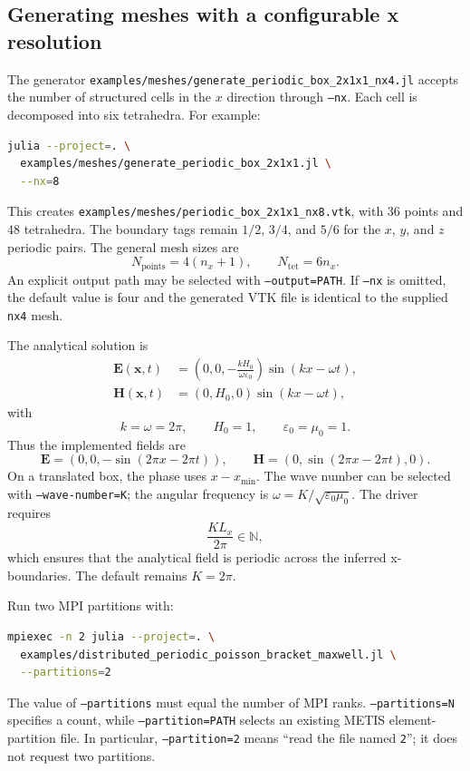 \documentclass[11pt,oneside]{book}
\newcommand{\code}[1]{\texttt{#1}}
\newcommand{\vect}[1]{\boldsymbol{#1}}
\begin{document}
\subsection{Generating meshes with a configurable x resolution}

The generator
\code{examples/meshes/generate\_periodic\_box\_2x1x1\_nx4.jl} accepts the
number of structured cells in the $x$ direction through \code{--nx}. Each
cell is decomposed into six tetrahedra. For example:
\begin{lstlisting}[language=bash]
julia --project=. \
  examples/meshes/generate_periodic_box_2x1x1.jl \
  --nx=8
\end{lstlisting}
This creates
\code{examples/meshes/periodic\_box\_2x1x1\_nx8.vtk}, with 36 points and
48 tetrahedra. The boundary tags remain $1/2$, $3/4$, and $5/6$ for the
$x$, $y$, and $z$ periodic pairs. The general mesh sizes are
\[
  N_{\mathrm{points}}=4(n_x+1),\qquad
  N_{\mathrm{tet}}=6n_x.
\]
An explicit output path may be selected with \code{--output=PATH}. If
\code{--nx} is omitted, the default value is four and the generated VTK file
is identical to the supplied \code{nx4} mesh.

The analytical solution is
\begin{align}
  \vect E(\vect x,t)
    &= \left(0,0,-\frac{kH_0}{\omega\varepsilon_0}\right)
       \sin(kx-\omega t),\\
  \vect H(\vect x,t)
    &= (0,H_0,0)\sin(kx-\omega t),
\end{align}
with
\[
  k=\omega=2\pi,\qquad
  H_0=1,\qquad
  \varepsilon_0=\mu_0=1.
\]
Thus the implemented fields are
\[
  \vect E=(0,0,-\sin(2\pi x-2\pi t)),\qquad
  \vect H=(0,\sin(2\pi x-2\pi t),0).
\]
On a translated box, the phase uses $x-x_{\min}$. The wave number can be
selected with \code{--wave-number=K}; the angular frequency is
$\omega=K/\sqrt{\varepsilon_0\mu_0}$. The driver requires
\[
  \frac{K L_x}{2\pi}\in\mathbb{N},
\]
which ensures that the analytical field is periodic across the inferred
x-boundaries. The default remains $K=2\pi$.

Run two MPI partitions with:
\begin{lstlisting}[language=bash]
mpiexec -n 2 julia --project=. \
  examples/distributed_periodic_poisson_bracket_maxwell.jl \
  --partitions=2
\end{lstlisting}

The value of \code{--partitions} must equal the number of MPI ranks.
\code{--partitions=N} specifies a count, while \code{--partition=PATH}
selects an existing METIS element-partition file. In particular,
\code{--partition=2} means ``read the file named \code{2}''; it does not
request two partitions.
\end{document}
